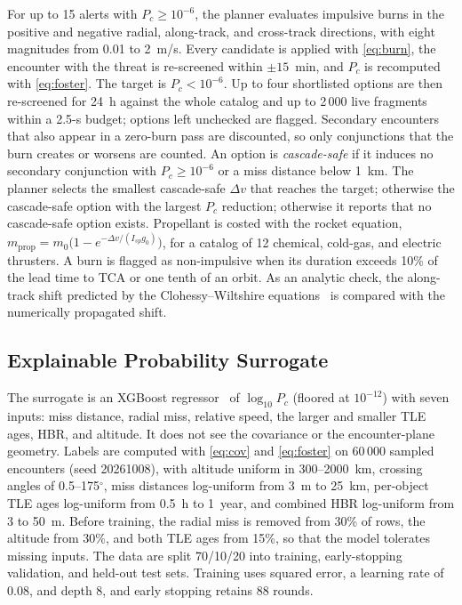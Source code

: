 \documentclass[conference]{IEEEtran}
\newcommand{\Pc}{P_c}
\begin{document}
For up to 15 alerts with $\Pc\ge10^{-6}$, the planner evaluates impulsive
burns in the positive and negative radial, along-track, and cross-track
directions, with eight magnitudes from 0.01 to 2~m/s. Every candidate is applied
with \eqref{eq:burn}, the encounter with the threat is re-screened within
$\pm15$~min, and $\Pc$ is recomputed with \eqref{eq:foster}. The target is
$\Pc<10^{-6}$. Up to four shortlisted options are then re-screened for 24~h
against the whole catalog and up to 2\,000 live fragments within a 2.5-s
budget; options left unchecked are flagged. Secondary
encounters that also appear in a zero-burn pass are discounted, so only
conjunctions that the burn creates or worsens are counted. An option is
\emph{cascade-safe} if it induces no secondary conjunction with
$\Pc\ge10^{-6}$ or a miss distance below 1~km. The planner selects the smallest
cascade-safe $\Delta v$ that reaches the target; otherwise the cascade-safe
option with the largest $\Pc$ reduction; otherwise it reports that no
cascade-safe option exists. Propellant is costed with the rocket equation,
$m_{\mathrm{prop}}=m_0\big(1-e^{-\Delta v/(I_{sp}g_0)}\big)$, for a catalog of
12 chemical, cold-gas, and electric thrusters. A burn is flagged as
non-impulsive when its duration exceeds 10\% of the lead time to TCA or one
tenth of an orbit. As an analytic check, the along-track shift predicted by the
Clohessy--Wiltshire equations~\cite{clohessy1960} is compared with the
numerically propagated shift.

\subsection{Explainable Probability Surrogate}

The surrogate is an XGBoost regressor~\cite{chen2016} of $\log_{10}\Pc$
(floored at $10^{-12}$) with seven inputs: miss distance, radial miss,
relative speed, the larger and smaller TLE ages, HBR, and altitude. It does
not see the covariance or the encounter-plane geometry. Labels are computed
with \eqref{eq:cov} and \eqref{eq:foster} on 60\,000 sampled encounters (seed
20261008), with altitude uniform in 300--2000~km, crossing angles of
0.5--175$^\circ$, miss distances log-uniform from 3~m to 25~km, per-object TLE
ages log-uniform from 0.5~h to 1~year, and combined HBR log-uniform from 3 to
50~m. Before training, the radial miss is removed from 30\% of rows, the
altitude from 30\%, and both TLE ages from 15\%, so that the model tolerates
missing inputs. The data are split 70/10/20 into training, early-stopping
validation, and held-out test sets. Training uses squared error, a learning rate
of 0.08, and depth 8, and early stopping retains 88 rounds.
\end{document}
